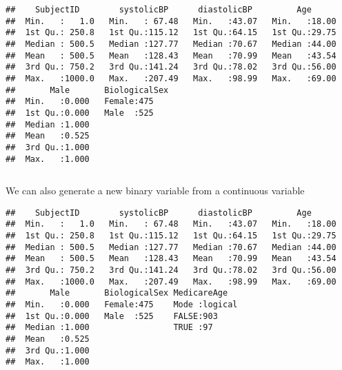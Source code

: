 \documentclass[
]{article}
\newenvironment{Shaded}{\begin{snugshade}}{\end{snugshade}}
\newcommand{\CommentTok}[1]{\textcolor[rgb]{0.56,0.35,0.01}{\textit{#1}}}
\newcommand{\DecValTok}[1]{\textcolor[rgb]{0.00,0.00,0.81}{#1}}
\newcommand{\FunctionTok}[1]{\textcolor[rgb]{0.13,0.29,0.53}{\textbf{#1}}}
\newcommand{\NormalTok}[1]{#1}
\newcommand{\OtherTok}[1]{\textcolor[rgb]{0.56,0.35,0.01}{#1}}
\newcommand{\SpecialCharTok}[1]{\textcolor[rgb]{0.81,0.36,0.00}{\textbf{#1}}}
\begin{document}
\begin{verbatim}
##    SubjectID        systolicBP      diastolicBP         Age       
##  Min.   :   1.0   Min.   : 67.48   Min.   :43.07   Min.   :18.00  
##  1st Qu.: 250.8   1st Qu.:115.12   1st Qu.:64.15   1st Qu.:29.75  
##  Median : 500.5   Median :127.77   Median :70.67   Median :44.00  
##  Mean   : 500.5   Mean   :128.43   Mean   :70.99   Mean   :43.54  
##  3rd Qu.: 750.2   3rd Qu.:141.24   3rd Qu.:78.02   3rd Qu.:56.00  
##  Max.   :1000.0   Max.   :207.49   Max.   :98.99   Max.   :69.00  
##       Male       BiologicalSex
##  Min.   :0.000   Female:475   
##  1st Qu.:0.000   Male  :525   
##  Median :1.000                
##  Mean   :0.525                
##  3rd Qu.:1.000                
##  Max.   :1.000
\end{verbatim}

\(~\)

We can also generate a new binary variable from a continuous variable

\begin{Shaded}
\end{Shaded}

\begin{verbatim}
##    SubjectID        systolicBP      diastolicBP         Age       
##  Min.   :   1.0   Min.   : 67.48   Min.   :43.07   Min.   :18.00  
##  1st Qu.: 250.8   1st Qu.:115.12   1st Qu.:64.15   1st Qu.:29.75  
##  Median : 500.5   Median :127.77   Median :70.67   Median :44.00  
##  Mean   : 500.5   Mean   :128.43   Mean   :70.99   Mean   :43.54  
##  3rd Qu.: 750.2   3rd Qu.:141.24   3rd Qu.:78.02   3rd Qu.:56.00  
##  Max.   :1000.0   Max.   :207.49   Max.   :98.99   Max.   :69.00  
##       Male       BiologicalSex MedicareAge    
##  Min.   :0.000   Female:475    Mode :logical  
##  1st Qu.:0.000   Male  :525    FALSE:903      
##  Median :1.000                 TRUE :97       
##  Mean   :0.525                                
##  3rd Qu.:1.000                                
##  Max.   :1.000
\end{verbatim}
\end{document}
